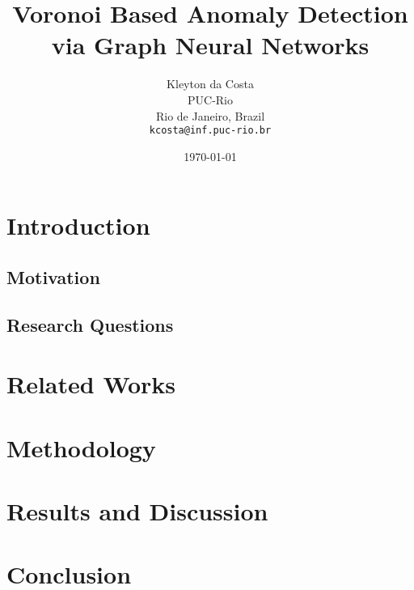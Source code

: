 \documentclass{article}
\title{Voronoi Based Anomaly Detection via Graph Neural Networks}
\date{\today}
\author{
  Kleyton da Costa \\
  PUC-Rio \\
  Rio de Janeiro, Brazil\\
  \texttt{kcosta@inf.puc-rio.br} \\
}
\begin{document}
\maketitle
	
\begin{abstract}
  
\end{abstract}
	
	
\section{Introduction}

\subsection{Motivation}

\subsection{Research Questions}


\section{Related Works}




\section{Methodology}


\section{Results and Discussion}



\section{Conclusion}


\end{document}
